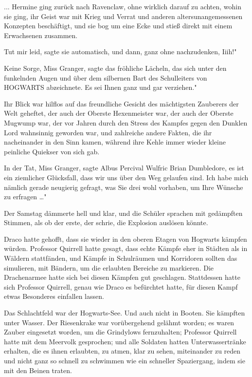 ... Hermine ging zurück nach Ravenclaw, ohne wirklich darauf zu achten, wohin
sie ging, ihr Geist war mit Krieg und Verrat und anderen altersunangemessenen
Konzepten beschäftigt, und sie bog um eine Ecke und stieß direkt mit einem
Erwachsenen zusammen.

\glqq Tut mir leid\grqq{}, sagte sie automatisch, und dann, ganz ohne
nachzudenken, \glqq Iiih!"

\glqq Keine Sorge, Miss Granger\grqq{}, sagte das fröhliche Lächeln, das sich
unter den funkelnden Augen und über dem silbernen Bart des Schulleiters von
HOGWARTS abzeichnete. \glqq Es sei Ihnen ganz und gar verziehen."

Ihr Blick war hilflos auf das freundliche Gesicht des mächtigsten Zauberers der
Welt geheftet, der auch der Oberste Hexenmeister war, der auch der Oberste
Mugwump war, der vor Jahren durch den Stress des Kampfes gegen den Dunklen Lord
wahnsinnig geworden war, und zahlreiche andere Fakten, die ihr nacheinander in
den Sinn kamen, während ihre Kehle immer wieder kleine peinliche Quiekser von
sich gab.

\glqq In der Tat, Miss Granger\grqq{}, sagte Albus Percival Wulfric Brian
Dumbledore, \glqq es ist ein ziemlicher Glücksfall, dass wir uns über den Weg
gelaufen sind. Ich habe mich nämlich gerade neugierig gefragt, was Sie drei wohl
vorhaben, um Ihre Wünsche zu erfragen …"


Der Samstag dämmerte hell und klar, und die Schüler sprachen mit gedämpften
Stimmen, als ob der erste, der schrie, die Explosion auslösen könnte.

Draco hatte gehofft, dass sie wieder in den oberen Etagen von Hogwarts kämpfen
würden. Professor Quirrell hatte gesagt, dass echte Kämpfe eher in Städten als
in Wäldern stattfänden, und Kämpfe in Schulräumen und Korridoren sollten das
simulieren, mit Bändern, um die erlaubten Bereiche zu markieren. Die
Drachenarmee hatte sich bei diesen Kämpfen gut geschlagen. Stattdessen hatte
sich Professor Quirrell, genau wie Draco es befürchtet hatte, für diesen Kampf
etwas Besonderes einfallen lassen.

Das Schlachtfeld war der Hogwarts-See. Und auch nicht in Booten. Sie kämpften
unter Wasser. Der Riesenkrake war vorübergehend gelähmt worden; es waren Zauber
eingesetzt worden, um die Grindylows fernzuhalten; Professor Quirrell hatte mit
dem Meervolk gesprochen; und alle Soldaten hatten Unterwassertränke erhalten,
die es ihnen erlaubten, zu atmen, klar zu sehen, miteinander zu reden und nicht
ganz so schnell zu schwimmen wie ein schneller Spaziergang, indem sie mit den
Beinen traten.

